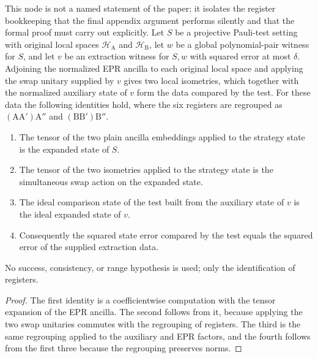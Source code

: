 \begin{theorem}
  \label{thm:pauli-extraction-isometry-construction-support}
  \leanok
  This node is not a named statement of the paper; it isolates the register
  bookkeeping that the final appendix argument performs silently and that the
  formal proof must carry out explicitly. Let $S$ be a projective Pauli-test
  setting with original local spaces $\mathcal H_{\mathrm A}$ and
  $\mathcal H_{\mathrm B}$, let $w$ be a global polynomial-pair witness for
  $S$, and let $v$ be an extraction witness for $S,w$ with squared error at
  most $\delta$. Adjoining the normalized EPR ancilla to each original local
  space and applying the swap unitary supplied by $v$ gives two local
  isometries, which together with the normalized auxiliary state of $v$ form
  the data compared by the test. For these data the following identities hold,
  where the six registers are regrouped as
  $(\mathrm{A}\mathrm{A}')\mathrm{A}''$ and
  $(\mathrm{B}\mathrm{B}')\mathrm{B}''$.
  \begin{enumerate}
    \item The tensor of the two plain ancilla embeddings applied to the
      strategy state is the expanded state of $S$.
    \item The tensor of the two isometries applied to the strategy state is
      the simultaneous swap action on the expanded state.
    \item The ideal comparison state of the test built from the auxiliary
      state of $v$ is the ideal expanded state of $v$.
    \item Consequently the squared state error compared by the test equals the
      squared error of the supplied extraction data.
  \end{enumerate}
  No success, consistency, or range hypothesis is used; only the identification
  of registers.
\end{theorem}
\begin{proof}
  \leanok
  The first identity is a coefficientwise computation with the tensor
  expansion of the EPR ancilla. The second follows from it, because applying
  the two swap unitaries commutes with the regrouping of registers. The third
  is the same regrouping applied to the auxiliary and EPR factors, and the
  fourth follows from the first three because the regrouping preserves norms.
\end{proof}

